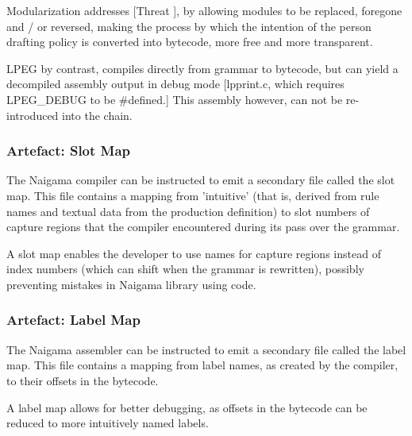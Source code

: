 Modularization addresses [Threat \thethreatbcerror], by allowing modules
to be replaced, foregone and / or reversed, making the process by which
the intention of the person drafting policy is converted into bytecode,
more free and more transparent.

LPEG \cite{bib:lpeg} by contrast, compiles directly from grammar to bytecode,
but can yield a decompiled assembly output in debug mode
[lpprint.c, which requires LPEG\_DEBUG to be \#defined.] This assembly
however, can not be re-introduced into the chain.

\subsubsection{Artefact: Slot Map}
The Naigama compiler can be instructed to emit a secondary file called
the slot map. This file contains a mapping from 'intuitive' (that is,
derived from rule names and textual data from the production definition)
to slot numbers of capture regions that the
compiler encountered during its pass over the grammar.

A slot map enables the developer to use names for capture regions instead
of index numbers (which can shift when the grammar is rewritten), possibly
preventing mistakes in Naigama library using code.

\subsubsection{Artefact: Label Map}
The Naigama assembler can be instructed to emit a secondary file called
the label map. This file contains a mapping from label names, as created
by the compiler, to their offsets in the bytecode.

A label map allows for better debugging, as offsets in the bytecode
can be reduced to more intuitively named labels.
